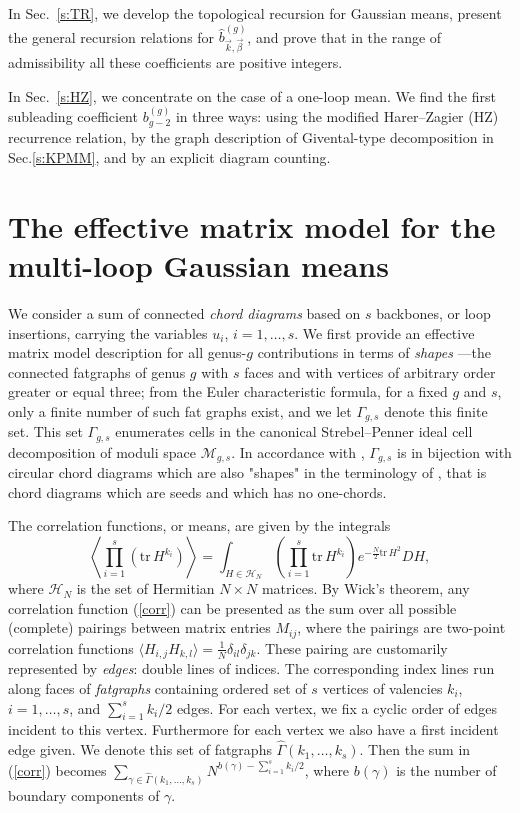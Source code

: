 \documentclass[11pt]{article}
\def\be{\begin{equation}}
\def\ee{\end{equation}}
\def\tr{{\mathrm{tr\,}}}
\theoremstyle{plain}
\theoremstyle{definition}
\begin{document}
In Sec.~\ref{s:TR}, we develop the topological recursion for Gaussian means, present the general recursion relations for
$\widehat b_{\vec k,\vec \beta}^{(g)}$, and prove that in the range of admissibility all these coefficients are positive integers. 

In Sec.~\ref{s:HZ}, we concentrate on the case of
a one-loop mean. We find the first subleading coefficient $b^{(g)}_{g-2}$ in three
ways: using the modified Harer--Zagier (HZ) recurrence relation, by the graph description of Givental-type decomposition
in Sec.\ref{s:KPMM}, and
by an explicit diagram counting.

\section{The effective matrix model for the multi-loop Gaussian means}
\label{s:matrix-model}
\setcounter{equation}{0}

We consider a sum of connected \emph{chord diagrams} based on $s$ backbones, or loop insertions, carrying the
variables $u_i$, $i=1,\dots,s$. We first provide an effective matrix model description for all
genus-$g$ contributions in terms of {\em shapes} ---the connected fatgraphs of genus $g$ with $s$ faces and with vertices
of arbitrary order greater or equal three; from the Euler characteristic formula, for a fixed $g$ and $s$, 
only a finite number of such fat graphs exist, and we let $\Gamma_{g,s}$ denote this finite set.  This set $\Gamma_{g,s}$
enumerates cells in the canonical Strebel--Penner ideal cell decomposition of moduli space ${\mathcal M}_{g,s}$.
In accordance with \cite{APRW}, 
$\Gamma_{g,s}$ is in bijection with circular chord diagrams which are also "shapes" in the terminology of \cite{APRW}, that is chord diagrams which are seeds and which has no one-chords.

The correlation functions, or means, are given by the integrals
\be
\left\langle\prod_{i=1}^s(\tr H^{k_i})\right\rangle = \int_{H\in \mathcal{H}_{N}} \left(\prod_{i=1}^s\tr H^{k_i}\right) e^{-\frac N2 \tr H^2} DH,
\label{corr}
\ee
where $\mathcal{H}_{N}$ is the set of Hermitian $N\times N$ matrices. 
By Wick's theorem, any correlation function (\ref{corr}) can be presented as the sum over all possible (complete) pairings between matrix entries $M_{ij}$, where the pairings are two-point correlation functions
$\langle H_{i,j}H_{k,l}\rangle =\frac 1N \delta_{il}\delta_{jk}$. These pairing are customarily represented
by \emph{edges}: double lines of indices. The corresponding index lines
run along faces of  \emph{fatgraphs} containing ordered set of $s$ vertices of valencies $k_i$, $i=1,\dots,s$, and $\sum_{i=1}^s k_i/2$ edges. 
For each vertex, we fix a cyclic order of edges incident to this vertex.
Furthermore for each vertex we also have a first incident edge given. We denote this set of fatgraphs $\widehat\Gamma(k_1,\dots,k_s)$. Then the sum in (\ref{corr}) becomes
$\sum_{\gamma\in \widehat\Gamma(k_1,\dots,k_s)}
N^{b(\gamma)-\sum_{i=1}^s k_i/2}$, where $b(\gamma)$ is the number of boundary components of $\gamma$.
\end{document}

